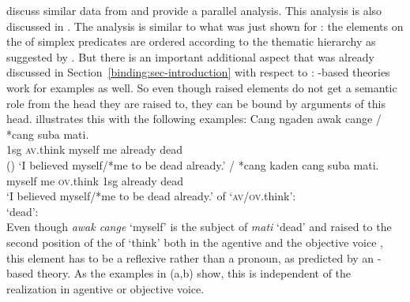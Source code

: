 \documentclass[output=paper,biblatex,babelshorthands,newtxmath,draftmode,colorlinks,citecolor=brown]{langscibook}
\begin{document}
\citet{WA98a-u} discuss similar data from  and provide a parallel analysis. This
analysis is also discussed in . The
analysis is similar to what was just shown for : the elements on the \argstl of
simplex predicates are ordered according to the thematic hierarchy as suggested by
\citet{Jackendoff72a-u}. But there is an important additional aspect that was already discussed in
Section~\ref{binding:sec-introduction} with respect to : \argst-based theories work for  examples as
well. So even though raised elements do not get a semantic role from the head they are raised to,
they can be bound by arguments of this head. \citet[--190]{Wechsler99a} illustrates this with the
following examples:
\eal
\ex
\gll Cang ngaden           {awak cange} /  *cang          suba    mati.\\
     1sg \textsc{av}.think myself    {} \hphantom{*}me already dead\\\hfill()
\glt `I believed myself/*me to be dead already.'
\ex
{} / *cang           kaden             cang suba    mati.\\
     myself       {} \hphantom{*}me \textsc{ov}.think 1sg  already dead\\
\glt `I believed myself/*me to be dead already.'
\ex \argst of `\textsc{av}/\textsc{ov}.think':\\
\ex `dead':\\
\zl
Even though \emph{awak cange} `myself' is the subject of \emph{mati} `dead' and raised to the second
position of the \argst of `think' both in the agentive and the objective voice , this element has to be
a reflexive rather than a pronoun, as predicted by an \argst-based theory. As the examples in
(a,b) show, this is independent of the realization in agentive or objective voice.
\end{document}
